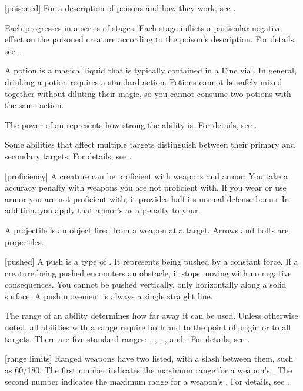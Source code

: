 [poisoned] For a description of poisons and how they work, see .

 Each  progresses in a series of stages.
Each stage inflicts a particular negative effect on the poisoned creature according to the poison's description.
For details, see .

 A potion is a magical liquid that is typically contained in a Fine vial.
In general, drinking a potion requires a standard action.
Potions cannot be safely mixed together without diluting their magic, so you cannot consume two potions with the same action.

 The power of an  represents how strong the ability is.
For details, see .

 Some abilities that affect multiple targets distinguish between their primary and secondary targets.
For details, see .

[proficiency] A creature can be proficient with weapons and armor.
You take a  accuracy penalty with weapons you are not proficient with.
If you wear or use armor you are not proficient with, it provides half its normal defense bonus.
In addition, you apply that armor's  as a penalty to your .

 A projectile is an object fired from a weapon at a target.
Arrows and bolts are projectiles.

[pushed] A push is a type of .
It represents being pushed by a constant force.
If a creature being pushed encounters an obstacle, it stops moving with no negative consequences.
You cannot be pushed vertically, only horizontally along a solid surface.
A push movement is always a single straight line.

 The range of an ability determines how far away it can be used.
Unless otherwise noted, all abilities with a range require both  and  to the point of origin or to all targets.
There are five standard ranges: \shortrange, \medrange, \longrange, \distrange, and \extrange.
For details, see .

[range limits] Ranged weapons have two  listed, with a slash between them, such as 60/180.
The first number indicates the maximum range for a weapon's .
The second number indicates the maximum range for a weapon's .
For details, see .

